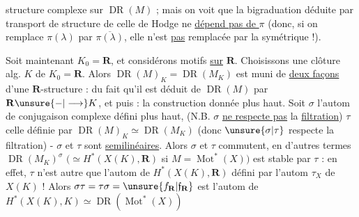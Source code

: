 structure  complexe sur $\operatorname{DR}(M)$ ; mais on voit que la bigraduation déduite par transport de structure de celle de Hodge ne \uline{dépend pas de $\pi$} (donc, si on remplace $\pi(\lambda)$ par $\overline{\pi(\lambda)}$, elle n'est \uline{pas} remplacée par la symétrique !).


 Soit maintenant $K_0=\mathbf R$, et considérons motifs  \uline{sur} $\mathbf R$. Choisissons une clôture alg. $K$ de $K_0=\mathbf R$. Alors $\operatorname{DR}(M)_K=\operatorname{DR}(M_K)$ est muni de \uline{deux façons} d'une $\mathbf R$-structure : du fait qu'il est déduit de $\operatorname{DR}(M)$ par $\mathbf R\unsure{-|\longrightarrow}K$, et puis : la construction donnée plus haut. Soit $\sigma$ l'autom de conjugaison complexe défini plus haut, (N.B. $\sigma$ \uline{ne respecte pas} la \uline{filtration}) $\tau$ celle définie par $\operatorname{DR}(M)_K\simeq\operatorname{DR}(M_K)$ (donc $\unsure{\sigma|\tau}$ respecte la filtration) - $\sigma$ et $\tau$ sont \uline{semilinéaires}. Alors $\sigma$ et $\tau$ commutent, en d'autres termes $\operatorname{DR}(M_K)^\sigma$ $(\simeq H^*(X(K),\mathbf R)$ si $M=\operatorname{Mot}^*(X))$ est stable par $\tau$ : en effet, $\tau$ n'est autre que l'autom de $H^*(X(K),\mathbf R)$ défini par l'autom $\tau_X$ de $X(K)$ ! Alors $\sigma\tau=\tau\sigma=\unsure{f_{\mathbf R}|\mathfrak f_{\mathbf R}}$ est l'autom de $H^*(X(K),K)\simeq\operatorname{DR}(\operatorname{Mot}^*(X))$

